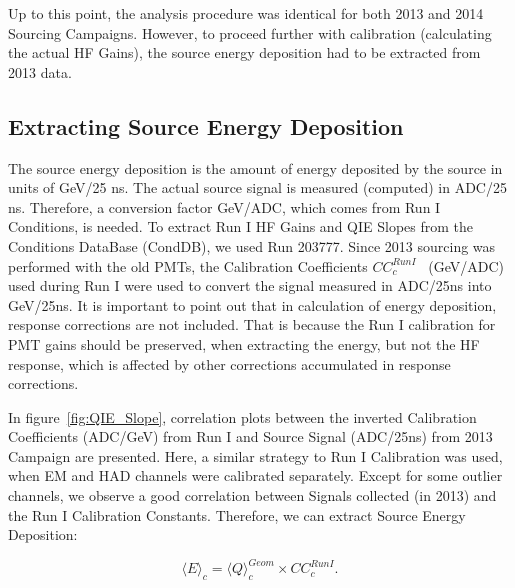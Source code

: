 Up to this point, the analysis procedure was identical for both 2013 and 2014
Sourcing Campaigns. However, to proceed further with calibration (calculating the
actual HF Gains), the source energy deposition had to be extracted from 2013 data.

\subsection{Extracting Source Energy Deposition}
The source energy deposition is the amount of energy deposited by the source in
units of GeV/25 ns. The actual source signal is measured (computed) in
ADC/25 ns. Therefore, a conversion factor GeV/ADC, which comes from
Run I Conditions, is needed. To extract Run I HF Gains and QIE Slopes from the Conditions DataBase (CondDB), we used Run 203777. Since 2013 sourcing was performed with the old PMTs, the
Calibration Coefficients ${CC}^{Run I}_{c}$~ (GeV/ADC) used during Run I were used to convert
the signal measured in ADC/25\unit{ns} into GeV/25\unit{ns}. It is important to point out that in calculation of energy deposition, response corrections are not included. That is because the Run I calibration for PMT gains should be preserved, when extracting the energy, but not the HF response, which is affected by other corrections accumulated in response corrections.

In figure~\ref{fig:QIE_Slope}, correlation plots between the inverted Calibration
Coefficients (ADC/GeV) from Run I and Source Signal (ADC/25\unit{ns}) from 2013
Campaign are presented. Here, a similar strategy to Run I Calibration was used, when
EM and HAD channels were calibrated separately. Except for some outlier channels,
we observe a good correlation between Signals collected (in 2013) and the Run I
Calibration Constants. Therefore, we can extract Source Energy Deposition:
\begin{center}
	\begin{equation}
		\label{eq:Edep}
		{\langle{E}\rangle}_{c} = {\langle{Q}\rangle}^{Geom}_{c} \times {CC^{Run I}_{c}}.
	\end{equation}
\end{center}

